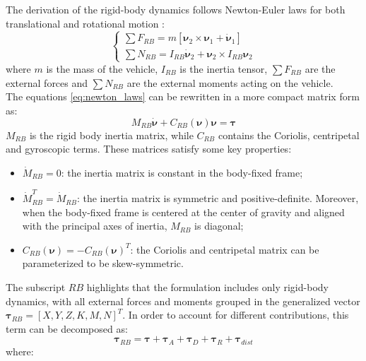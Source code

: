 The derivation of the rigid-body dynamics follows Newton-Euler laws for both translational and rotational motion \cite{fossenHandbookMarineCraft2011}:
\begin{equation}
    \begin{cases}
        \sum F_{RB} = m[\mathbf{\nu}_2 \times \mathbf{\nu}_1 + \dot{\mathbf{\nu}}_1] \\
        \sum N_{RB} = I_{RB}\dot{\mathbf{\nu}}_2 + \mathbf{\nu}_2 \times I_{RB}\mathbf{\nu}_2
    \end{cases}
    \label{eq:newton_laws}
\end{equation}
where $m$ is the mass of the vehicle, $I_{RB}$ is the inertia tensor, $\sum F_{RB}$ are the external forces and $\sum N_{RB}$ are the external moments acting on the vehicle.\\
The equations \ref{eq:newton_laws} can be rewritten in a more compact matrix form as:
\begin{equation}
    M_{RB}\dot{\mathbf{\nu}} + C_{RB}(\mathbf{\nu})\mathbf{\nu} = \mathbf{\tau}
    \label{eq:6dof_dyn_simple}
\end{equation}
$M_{RB}$ is the rigid body inertia matrix, while $C_{RB}$ contains the Coriolis, centripetal and gyroscopic terms.
These matrices satisfy some key properties:
\begin{itemize}
    \item $\dot M_{RB} = 0$: the inertia matrix is constant in the body-fixed frame;
    \item $\dot M_{RB}^T = \dot M_{RB}$: the inertia matrix is symmetric and positive-definite. Moreover, when the body-fixed frame is centered at the 
    center of gravity and aligned with the principal axes of inertia, $M_{RB}$ is diagonal;
    \item $C_{RB}(\mathbf{\nu}) = -C_{RB}(\mathbf{\nu})^T$: the Coriolis and centripetal matrix can be parameterized to be skew-symmetric.
\end{itemize}
The subscript $RB$ highlights that the formulation includes only rigid-body dynamics, with all external forces and moments grouped in the generalized vector
$\mathbf{\tau}_{RB} = [X, Y, Z, K, M, N]^T$. In order to account for different contributions, this term can be decomposed as:
\begin{equation}
    \mathbf{\tau}_{RB} = \mathbf{\tau} + \mathbf{\tau}_{A} + \mathbf{\tau}_{D} + \mathbf{\tau}_{R} + \mathbf{\tau}_{dist}
    \label{eq:6dof_tau_simple}
\end{equation}
where:

